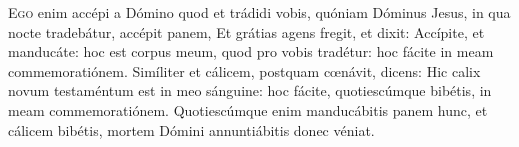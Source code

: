 
\lettrine{E}{go} enim accépi a Dómino quod et trádidi vobis, quóniam Dóminus Jesus, in qua nocte tradebátur, accépit panem, 
Et grátias agens fregit, et dixit: Accípite, et manducáte: hoc est corpus meum, quod pro vobis tradétur: hoc fácite in meam commemoratiónem. 
Simíliter et cálicem, postquam cœnávit, dicens: Hic calix novum testaméntum est in meo sánguine: hoc fácite, quotiescúmque bibétis, in meam commemoratiónem. 
Quotiescúmque enim manducábitis panem hunc, et cálicem bibétis, mortem Dómini annuntiábitis donec véniat.